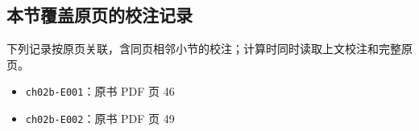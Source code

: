 \documentclass[
  10pt,
  fontset=fandol]{ctexart}
\providecommand{\tightlist}{%
  \setlength{\itemsep}{0pt}\setlength{\parskip}{0pt}}
\begin{document}
\subsection{本节覆盖原页的校注记录}\label{ux672cux8282ux8986ux76d6ux539fux9875ux7684ux6821ux6ce8ux8bb0ux5f55}

下列记录按原页关联，含同页相邻小节的校注；计算时同时读取上文校注和完整原页。

\begin{itemize}
\tightlist
\item
  \texttt{ch02b-E001}：原书 PDF 页 46
\item
  \texttt{ch02b-E002}：原书 PDF 页 49
\end{itemize}
\end{document}
